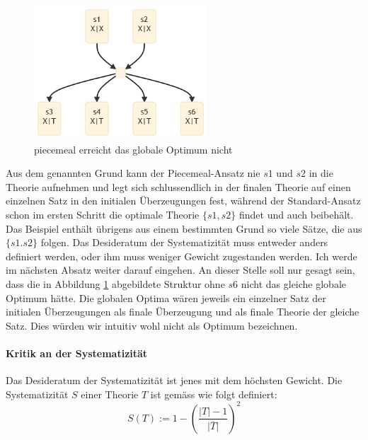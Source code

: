 \documentclass{article}
\begin{document}
\begin{figure}[ht]
  \centering
  \includegraphics[width=\textwidth,height=5cm,keepaspectratio]{images/standard_better.png}
  \caption{piecemeal erreicht das globale Optimum nicht\label{fig:standard_better}}
\end{figure}

Aus dem genannten Grund kann der Piecemeal-Ansatz nie $s1$ und $s2$ in die Theorie aufnehmen und legt sich schlussendlich in der finalen Theorie auf einen einzelnen Satz in den initialen Überzeugungen fest, während der Standard-Ansatz schon im ersten Schritt die optimale Theorie $\{s1, s2\}$ findet und auch beibehält. Das Beispiel enthält übrigens aus einem bestimmten Grund so viele Sätze, die aus $\{s1. s2\}$ folgen. Das Desideratum der Systematizität muss entweder anders definiert werden, oder ihm muss weniger Gewicht zugestanden werden. Ich werde im nächsten Absatz weiter darauf eingehen. An dieser Stelle soll nur gesagt sein, dass die in Abbildung \ref{fig:standard_better} abgebildete Struktur ohne $s6$ nicht das gleiche globale Optimum hätte. Die globalen Optima wären jeweils ein einzelner Satz der initialen Überzeugungen als finale Überzeugung und als finale Theorie der gleiche Satz. Dies würden wir intuitiv wohl nicht als Optimum bezeichnen.

\paragraph{Kritik an der Systematizität}
Das Desideratum der Systematizität ist jenes mit dem höchsten Gewicht. Die Systematizität $S$ einer Theorie $T$ ist gemäss \autocite[S. 465]{beisbart_making_2021} wie folgt definiert:
$$
S(T) := 1- \left(\frac{\lvert T \rvert -1}{\lvert \overline{T} \rvert}\right)^2
$$
\end{document}
